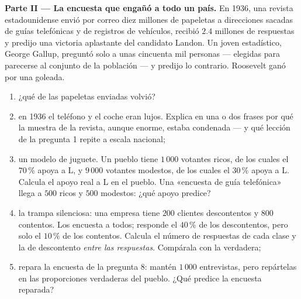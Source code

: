 \begin{problem}
\medskip
\noindent\textbf{Parte II --- La encuesta que engañó a todo un país.}
En 1936, una revista estadounidense envió por correo diez millones de papeletas a
direcciones sacadas de guías telefónicas y de registros de
vehículos, recibió $2.4$ millones de respuestas y predijo una victoria
aplastante del candidato Landon. Un joven estadístico, George
Gallup, preguntó solo a unas cincuenta mil personas --- elegidas para
parecerse al conjunto de la población --- y predijo lo contrario.
Roosevelt ganó por una goleada.
\begin{enumerate}[resume]
  \item ¿qué  de las papeletas enviadas volvió?
  \item en 1936 el teléfono y el coche eran lujos. Explica en
        una o dos frases por qué la muestra de la revista, aunque
        enorme, estaba condenada --- y qué lección de la pregunta 1
        repite a escala nacional;
  \item un modelo de juguete. Un pueblo tiene $1\,000$ votantes ricos, de los cuales
        el $70\,\%$ apoya a L, y $9\,000$ votantes modestos, de los cuales
        el $30\,\%$ apoya a L. Calcula el apoyo real a L en el
        pueblo. Una «encuesta de guía telefónica» llega a $500$ ricos
        y $500$ modestos: ¿qué apoyo predice?
  \item la trampa silenciosa: una empresa tiene $200$ clientes descontentos
        y $800$ contentos. Los encuesta a todos; responde el $40\,\%$ de
        los descontentos, pero solo el $10\,\%$ de los contentos.
        Calcula el número de respuestas de cada clase y la
         de descontento \emph{entre las respuestas}.
        Compárala con la  verdadera;
  \item repara la encuesta de la pregunta 8: mantén $1\,000$
        entrevistas, pero repártelas en las proporciones verdaderas
        del pueblo. ¿Qué predice la encuesta reparada?
\end{enumerate}


\end{problem}
